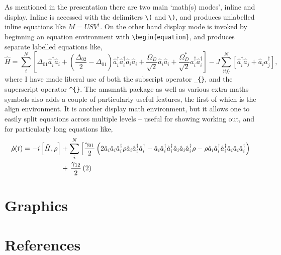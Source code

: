 \documentclass[a4paper,11pt,twoside]{article}		%
\begin{document}
As mentioned in the presentation there are two main `math(s) modes', inline and display. Inline is accessed with the delimiters \verb:\(: and \verb:\):, and produces unlabelled inline equations like \(M = USV^{\dagger}\). On the other hand display mode is invoked by beginning an equation environment with \verb:\begin{equation}:, and produces separate labelled equations like,
\begin{equation}
\hat{H} = \sum_{i}^{N} \left[ \Delta_{01}\hat{a}_{i}^{\dagger}\hat{a}_{i} + \left(\frac{\Delta_{02}}{2} - \Delta_{01}\right)\hat{a}_{i}^{\dagger}\hat{a}_{i}^{\dagger}\hat{a}_{i}\hat{a}_{i} + \frac{\Omega_{D}}{\sqrt{2}}\hat{a}_{i}\hat{a}_{i} + \frac{\Omega_{D}^{*}}{\sqrt{2}}\hat{a}_{i}^{\dagger}\hat{a}_{i}^{\dagger} \right] - J\sum_{\langle ij \rangle}^{N} \left[ \hat{a}_{i}^{\dagger}\hat{a}_{j} + \hat{a}_{i}\hat{a}_{j}^{\dagger}\right],
\label{eq:1}
\end{equation}
where I have made liberal use of both the subscript operator \verb:_{}:, and the superscript operator \verb:^{}:. The amsmath package as well as various extra maths symbols also adds a couple of particularly useful features, the first of which is the align environment. It is another display math environment, but it allows one to easily split equations across multiple levels -- useful for showing working out, and for particularly long equations like,
\begin{align}
\dot{\rho}(t) = -i\left[ \hat{H}, \rho \right] &+ \sum_{i}^{N} \left[ \frac{\gamma_{01}}{2}\left(2\hat{a}_{i}\hat{a}_{i}\hat{a}_{i}^{\dagger} \rho \hat{a}_{i}\hat{a}_{i}^{\dagger}\hat{a}_{i}^{\dagger} - \hat{a}_{i}\hat{a}_{i}^{\dagger}\hat{a}_{i}^{\dagger} \hat{a}_{i}\hat{a}_{i}\hat{a}_{i}^{\dagger} \rho - \rho \hat{a}_{i}\hat{a}_{i}^{\dagger}\hat{a}_{i}^{\dagger} \hat{a}_{i}\hat{a}_{i}\hat{a}_{i}^{\dagger}\right) \right. \notag \\
&+ \left. \frac{\gamma_{12}}{2} \left(2  \right) \right. \notag \\
\label{eq:2}
\end{align}

\section{Graphics}

\section{References}
\end{document}
